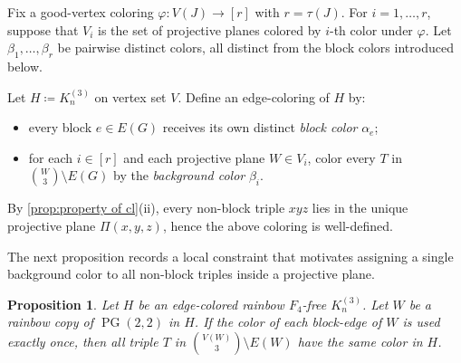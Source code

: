 \documentclass[10pt,a4paper]{article}
\newtheorem{proposition}[theorem]{Proposition}
\theoremstyle{definition}
\DeclareMathOperator{\PG}{PG}
\begin{document}
Fix a good-vertex coloring $\varphi\colon V(J)\to[r]$ with $r=\tau(J)$.
For $i=1,\ldots,r$, suppose that $V_i$ is the set of projective planes colored by $i$-th color under $\varphi$.
Let $\beta_1,\ldots,\beta_r$ be pairwise distinct colors, all distinct from the block colors introduced below.

Let $H\coloneqq K_n^{(3)}$ on vertex set $V$.
Define an edge-coloring of $H$ by:
\begin{itemize}
    \item every block $e\in E(G)$ receives its own distinct {\it block color} $\alpha_e$;
    \item for each $i\in[r]$ and each projective plane $W\in V_i$, color every $T$ in $\binom{W}{3}\setminus E(G)$ by the {\it background color} $\beta_i$.
\end{itemize}
By \cref{prop:property of cl}(ii), every non-block triple $xyz$ lies in the unique projective plane $\Pi(x,y,z)$, hence the above coloring is well-defined.

The next proposition records a local constraint that motivates assigning a single background color to all non-block triples inside a projective plane.
\begin{proposition}\label{prop:fano_comp_mono}
    Let $H$ be an edge-colored rainbow $F_4$-free $K_n^{(3)}$.
    Let $W$ be a rainbow copy of $\PG(2,2)$ in $H$.
    If the color of each block-edge of $W$ is used exactly once, then all triple $T$ in $\binom{V(W)}{3}\setminus E(W)$ have the same color in $H$.
\end{proposition}
\end{document}
